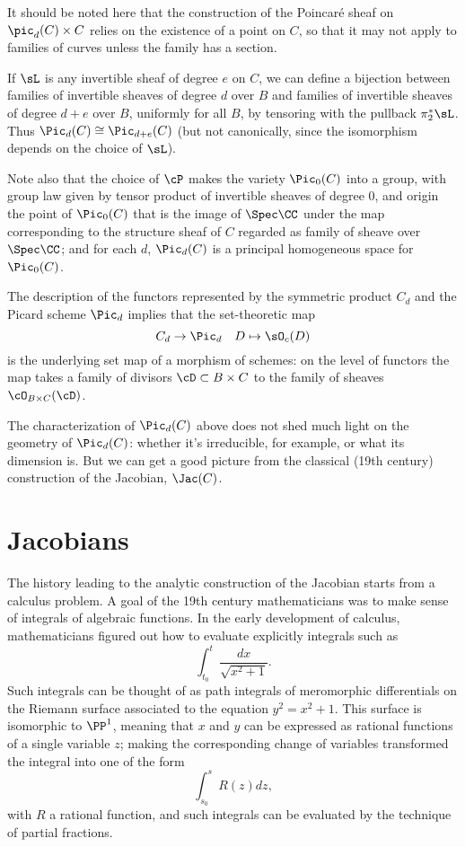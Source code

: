  It should be noted here that the construction of the Poincar\'e sheaf on $\pic_d(C) \times C$ relies on the existence of a point on $C$, so that it may not apply to families of curves unless the family has a section.
 
If $\sL$ is any invertible sheaf of degree $e$ on $C$, we can define a bijection between families of invertible sheaves of degree $d$ over $B$ and families of invertible sheaves of degree $d+e$ over $B$, uniformly for all $B$, by tensoring with the pullback $\pi_2^*\sL$. Thus $\Pic_d(C) \cong \Pic_{d+e}(C)$ (but not canonically, since the isomorphism depends on the choice of $\sL$).
 
 Note also that the choice of $\cP$ makes the variety $\Pic_0(C)$ into a group, with group law given by tensor product of invertible sheaves of degree 0, and origin the point of $\Pic_0(C)$ that is the
 image of $\Spec \CC$ under the map corresponding to the structure sheaf of $C$ regarded
 as family of sheave over $\Spec \CC$; and for each $d$, $\Pic_d(C)$ is a principal homogeneous space for $\Pic_0(C)$. 
 
The description of the functors represented by the symmetric product $C_d$ and the Picard scheme $\Pic_d$ implies that the 
set-theoretic map
$$
C_d \to \Pic_d \quad D \mapsto \sO_c(D)
$$
is the underlying set map of a morphism of schemes: on the level of functors the map takes a family of divisors $\cD\subset B\times C$
to the family of sheaves $\cO_{B\times C}(\cD)$.

The characterization of $\Pic_d(C)$ above does not shed much light on the geometry of $\Pic_d(C)$: whether it's irreducible, for example, or what its dimension is. But we can get a  good picture from the classical (19th century) construction of the Jacobian, $\Jac(C)$.
 
\section{Jacobians}

The history leading to the analytic construction of the Jacobian starts from a calculus problem. A goal of the 19th century mathematicians was  to make sense of integrals of algebraic functions. In the early development of calculus, mathematicians figured out how to evaluate explicitly integrals such as
$$
\int_{t_0}^t \frac{dx}{\sqrt{x^2+1}}.
$$
Such integrals can be thought of as path integrals of meromorphic differentials on the Riemann surface associated to the equation $y^2 = x^2+1$. This surface is isomorphic to $\PP^1$, meaning that $x$ and $y$ can be expressed as rational functions of a single variable $z$; making the corresponding change of variables transformed the integral into one of the form
$$
\int_{s_0}^s R(z)dz,
$$
with $R$ a rational function, and such integrals can be evaluated by the technique of partial fractions.

